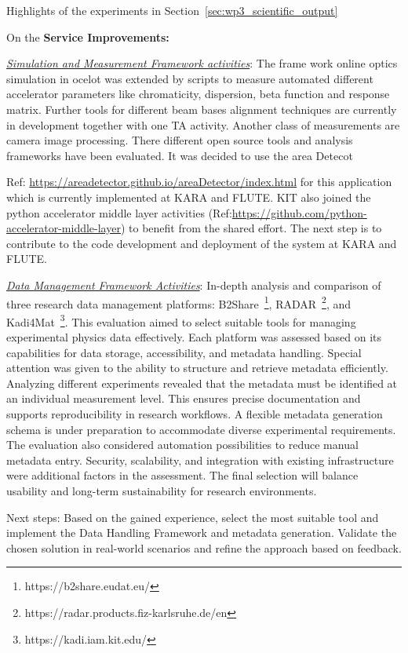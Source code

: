 Highlights of the experiments in Section~\ref{sec:wp3_scientific_output}

On the \textbf{Service Improvements:}

\underline{\em{Simulation and Measurement Framework activities}}:  
The frame work online optics simulation in ocelot was extended by scripts to measure automated different accelerator parameters like chromaticity, dispersion, beta function and response matrix. Further tools for different beam bases alignment  techniques are currently in development together with one TA activity. Another class of measurements are camera image processing. There different open source tools and analysis frameworks have been evaluated. It was decided to use the area Detecot {Ref: \url{https://areadetector.github.io/areaDetector/index.html} for this application which is currently implemented at KARA and FLUTE. KIT also joined the python accelerator middle layer activities (Ref:\url{https://github.com/python-accelerator-middle-layer}) to benefit from the shared effort. The next step is to contribute to the code development and deployment of the system at KARA and FLUTE.

\underline{\em{Data Management Framework Activities}}: 
In-depth analysis and comparison of three research data management platforms: B2Share~\footnote{https://b2share.eudat.eu/}, RADAR~\footnote{https://radar.products.fiz-karlsruhe.de/en}, and Kadi4Mat~\footnote{https://kadi.iam.kit.edu/}. This evaluation aimed to select suitable tools for managing experimental physics data effectively. Each platform was assessed based on its capabilities for data storage, accessibility, and metadata handling. Special attention was given to the ability to structure and retrieve metadata efficiently. Analyzing different experiments revealed that the metadata must be identified at an individual measurement level. This ensures precise documentation and supports reproducibility in research workflows. A flexible metadata generation schema is under preparation to accommodate diverse experimental requirements. The evaluation also considered automation possibilities to reduce manual metadata entry. Security, scalability, and integration with existing infrastructure were additional factors in the assessment. The final selection will balance usability and long-term sustainability for research environments.

Next steps: Based on the gained experience, select the most suitable tool and implement the Data Handling Framework and metadata generation. Validate the chosen solution in real-world scenarios and refine the approach based on feedback.

}
